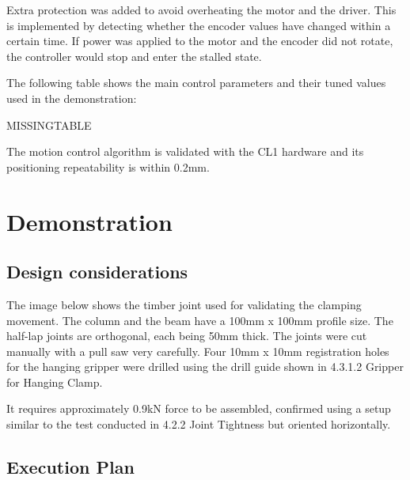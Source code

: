 Extra protection was added to avoid overheating the motor and the driver. This is implemented by detecting whether the encoder values have changed within a certain time. If power was applied to the motor and the encoder did not rotate, the controller would stop and enter the stalled state. 

The following table shows the main control parameters and their tuned values used in the demonstration:

MISSINGTABLE

The motion control algorithm is validated with the CL1 hardware and its positioning repeatability is within 0.2mm.

\section{Demonstration}
\label{section:exploration-1-demonstration}

\subsection{Design considerations}
\label{subsection:exploration-1-design-considerations}

The image below shows the timber joint used for validating the clamping movement. The column and the beam have a 100mm x 100mm profile size. The half-lap joints are orthogonal, each being 50mm thick. The joints were cut manually with a pull saw very carefully. Four 10mm x 10mm registration holes for the hanging gripper were drilled using the drill guide shown in 4.3.1.2 Gripper for Hanging Clamp.

It requires approximately 0.9kN force to be assembled, confirmed using a setup similar to the test conducted in 4.2.2 Joint Tightness but oriented horizontally.
\subsection{Execution Plan}
\label{subsection:exploration-1-execution-plan}

